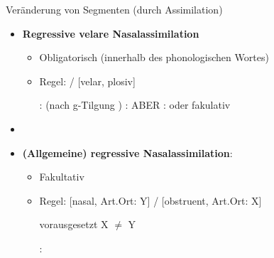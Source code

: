 
\begin{frame}{Veränderung von Segmenten (durch Assimilation)}

\begin{itemize}
	\item \textbf{Regressive velare Nasalassimilation}

	\begin{itemize}
		\item Obligatorisch (innerhalb des phonologischen Wortes)
		\item Regel:  \ras \textipa{[N]} /  \underline{\quad} [velar, plosiv]

	\eal		
		\ex {}:  \ras {} (nach g-Tilgung \ras \textipa{[fy:.{\textscr}UN]})
		\ex {}:  \ras \textipa{[baNk]}
		\ex ABER :  \ras {} oder fakulativ 
	\zl
	
 	\end{itemize}


	\item[]
	\item \textbf{(Allgemeine) regressive Nasalassimilation}:

	\begin{itemize}
		\item Fakultativ
		\item Regel: [nasal, Art.Ort: Y]  /  \underline{\quad} [obstruent, Art.Ort: X]
		
		vorausgesetzt X $\neq$ Y

		\ea {}:  \ras \textipa{[fYmf]}
		\z
		
	\end{itemize}		

\end{itemize}

\end{frame}


